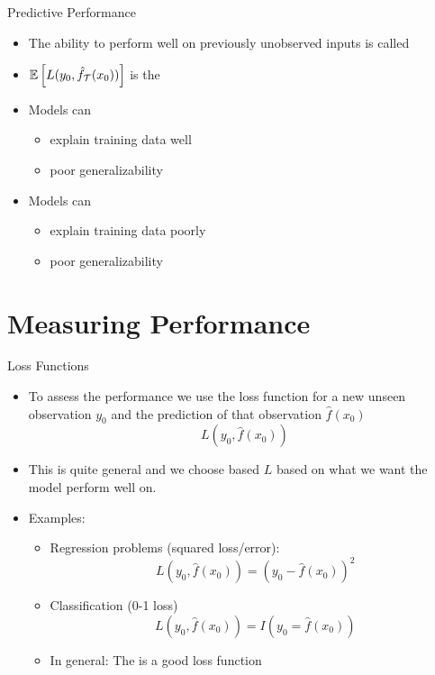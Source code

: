 \documentclass[10pt]{beamer}
\begin{document}
\begin{frame}{Predictive Performance}
\begin{itemize}
\item The ability to perform well on previously unobserved inputs is called 
\item $\operatorname{\mathbb{E}}\left[L(y_0,\hat{f}_\mathcal{T}(x_0))\right]$ is the 
\pause
\item Models can %
\begin{itemize}
\item explain training data well
\item poor generalizability
\end{itemize}
\pause
\item Models can 
\begin{itemize}
\item explain training data poorly
\item poor generalizability
\end{itemize}
\end{itemize}

\end{frame}

\section{Measuring Performance}
\frame{\sectionpage}

\begin{frame}{Loss Functions}



\begin{itemize}

\item To assess the performance we use the loss function for a new unseen observation $y_0$ and the prediction of that observation $\hat{f}(x_0)$
\[
L(y_0,\hat{f}(x_0))
\]
\pause
\item This is quite general and we choose based $L$ based on what we want the model perform well on.\pause
\item Examples:
\begin{itemize}
\item Regression problems (squared loss/error):
\[
    L(y_0,\hat{f}(x_0)) = (y_0 - \hat{f}(x_0))^2
\]
\pause
\item Classification (0-1 loss)
\[
    L(y_0,\hat{f}(x_0)) = I(y_0 = \hat{f}(x_0))
\]
\pause
\item In general: The  is a good loss function
\end{itemize}


\end{itemize}

\end{frame}
\end{document}
